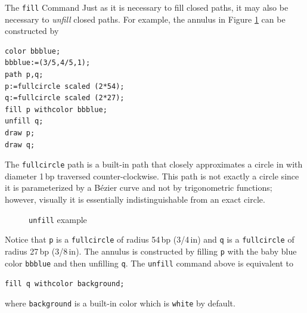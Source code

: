 \begin{subsection}{The \texttt{fill} Command}
Just as it is necessary to fill closed paths, it may also be necessary to \textit{unfill} closed paths.  For example, the annulus in Figure \ref{fig:annulus1} can be constructed by
\begin{lstlisting}[xleftmargin=38bp]
color bbblue;
bbblue:=(3/5,4/5,1);
path p,q;
p:=fullcircle scaled (2*54);
q:=fullcircle scaled (2*27);
fill p withcolor bbblue;
unfill q;
draw p;
draw q;
\end{lstlisting}
The \texttt{fullcircle} path is a built-in path that closely approximates a circle in \MP{} with diameter 1\,bp traversed counter-clockwise.  This path is not exactly a circle since it is parameterized by a B\'{e}zier curve and not by trigonometric functions; however, visually it is essentially indistinguishable from an exact circle.
\begin{figure}[hptb]
	\begin{center}\end{center}
	\caption{\texttt{unfill} example}\label{fig:annulus1}
\end{figure}
Notice that \texttt{p} is a \texttt{fullcircle} of radius 54\,bp (3/4\,in) and \texttt{q} is a \texttt{fullcircle} of radius 27\,bp (3/8\,in).  The annulus is constructed by filling \texttt{p} with the baby blue color \texttt{bbblue} and then unfilling \texttt{q}.  The \texttt{unfill} command above is equivalent to \begin{center}\verb|fill q withcolor background;|\end{center} where \texttt{background} is a built-in color which is \texttt{white} by default.


\end{subsection}
